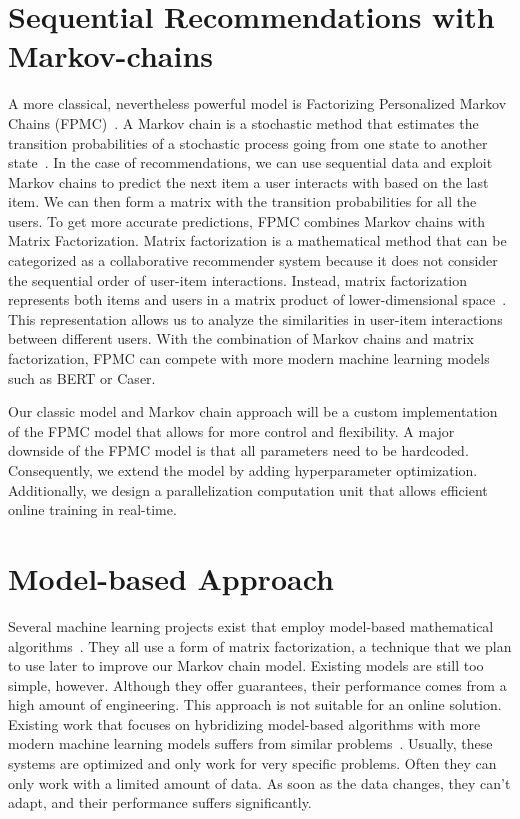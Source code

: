 \section{Sequential Recommendations with Markov-chains}
A more classical, nevertheless powerful model is Factorizing Personalized Markov Chains (FPMC)~\cite{rendlefactorizing}. A Markov chain is a stochastic method that estimates the transition probabilities of a stochastic process going from one state to another state~\cite{kemeny1976markov}. In the case of recommendations, we can use sequential data and exploit Markov chains to predict the next item a user interacts with based on the last item. We can then form a matrix with the transition probabilities for all the users. To get more accurate predictions, FPMC combines Markov chains with Matrix Factorization. Matrix factorization is a mathematical method that can be categorized as a collaborative recommender system because it does not consider the sequential order of user-item interactions. Instead, matrix factorization represents both items and users in a matrix product of lower-dimensional space~\cite{koren2009matrix}. This representation allows us to analyze the similarities in user-item interactions between different users. With the combination of Markov chains and matrix factorization, FPMC can compete with more modern machine learning models such as BERT or Caser.

Our classic model and Markov chain approach will be a custom implementation of the FPMC model that allows for more control and flexibility. A major downside of the FPMC model is that all parameters need to be hardcoded. Consequently, we extend the model by adding hyperparameter optimization. Additionally, we design a parallelization computation unit that allows efficient online training in real-time.


\section{Model-based Approach}
Several machine learning projects exist that employ model-based mathematical algorithms~\cite{jin2019latent,yoon2018fast,yoon2019fast}. They all use a form of matrix factorization, a technique that we plan to use later to improve our Markov chain model. Existing models are still too simple, however. Although they offer guarantees, their performance comes from a high amount of engineering. This approach is not suitable for an online solution. Existing work that focuses on hybridizing model-based algorithms with more modern machine learning models suffers from similar problems~\cite{shlezinger2020model}. Usually, these systems are optimized and only work for very specific problems. Often they can only work with a limited amount of data. As soon as the data changes, they can't adapt, and their performance suffers significantly.


